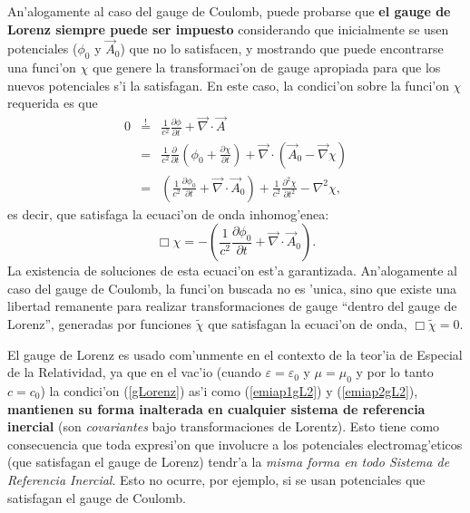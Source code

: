 An'alogamente al caso del gauge de Coulomb, puede probarse que \textbf{el gauge de Lorenz siempre puede ser impuesto} considerando que inicialmente se usen potenciales ($\phi_0$ y $\vec{A}_0$) que no lo satisfacen, y mostrando que puede encontrarse una funci'on $\chi$ que genere la transformaci'on de gauge apropiada para que los nuevos potenciales s'i la satisfagan. En este caso, la condici'on sobre la funci'on $\chi$ requerida es que
\begin{eqnarray}
0&\stackrel{!}{=}&\frac{1}{c^2}\frac{\partial\phi}{\partial t}+\vec{\nabla}\cdot\vec{A} \\
&=&\frac{1}{c^2}\frac{\partial\ }{\partial t}\left(\phi_0+\frac{\partial\chi}{\partial t}\right)+\vec{\nabla}\cdot\left(\vec{A}_0-\vec\nabla\chi\right) \\
&=&\left(\frac{1}{c^2}\frac{\partial\phi_0}{\partial t} +\vec{\nabla}\cdot\vec{A}_0\right) +\frac{1}{c^2}\frac{\partial^2\chi }{\partial t^2}-\nabla^2\chi,
\end{eqnarray}
es decir, que satisfaga la ecuaci'on de onda inhomog'enea:
\begin{equation}
\Box\chi=-\left(\frac{1}{c^2}\frac{\partial\phi_0}{\partial t} +\vec{\nabla}\cdot\vec{A}_0\right).
\end{equation}
La existencia de soluciones de esta ecuaci'on est'a garantizada. An'alogamente al caso del gauge de Coulomb, la funci'on buscada no es 'unica, sino que existe una libertad remanente para realizar transformaciones de gauge ``dentro del gauge de Lorenz'', generadas por funciones $\tilde\chi$ que satisfagan la ecuaci'on de onda, $\Box\tilde\chi=0$. 

El gauge de Lorenz es usado com'unmente en el contexto de la teor'ia de Especial de la Relatividad, ya que en el vac'io (cuando $\varepsilon=\varepsilon_0$ y $\mu=\mu_0$ y por lo tanto $c=c_0$) la condici'on (\ref{gLorenz}) as'i como (\ref{emiap1gL2}) y (\ref{emiap2gL2}), \textbf{mantienen su forma inalterada en cualquier sistema de referencia inercial} (son \textit{covariantes} bajo transformaciones de Lorentz). Esto tiene como consecuencia que toda expresi'on que involucre a los potenciales electromag'eticos (que satisfagan el gauge de Lorenz) tendr'a la \textit{misma forma en todo Sistema de Referencia Inercial}. Esto no ocurre, por ejemplo, si se usan potenciales que satisfagan el gauge de Coulomb.